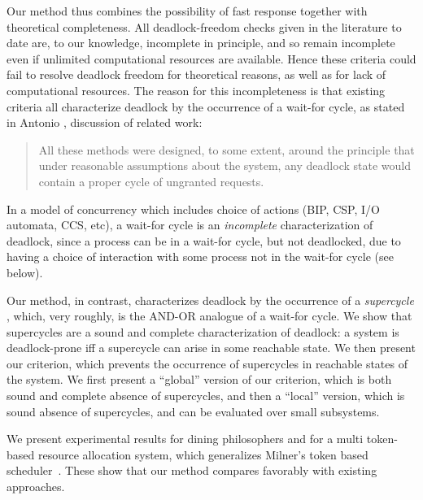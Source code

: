 Our method thus combines the possibility of fast response together with theoretical completeness.
All deadlock-freedom checks given in the literature to date are, to our knowledge, incomplete in
principle, and so remain incomplete even if unlimited computational resources are available.
Hence these criteria could fail to resolve deadlock freedom for theoretical reasons, as well as for 
lack of computational resources.
%
The reason for this incompleteness is that existing criteria all characterize deadlock by the
occurrence of a wait-for cycle, \eg as stated in Antonio \etal \cite{AGR16}, discussion of related
work:
\begin{quote}
All these methods were designed, to some extent, around the principle that under reasonable
assumptions about the system, any deadlock state would contain a proper cycle of ungranted requests.
\end{quote}
In a model of concurrency which includes choice of actions
(\eg BIP, CSP, I/O automata, CCS, etc), a wait-for cycle is an \emph{incomplete} characterization of
deadlock, since a process can be in a wait-for cycle, but not deadlocked, due to having a choice of
interaction with some process not in the wait-for cycle (see  below).

Our method, in contrast, characterizes deadlock by the occurrence of a \emph{supercycle}
\cite{AE98,AC05}, which, very roughly, is the AND-OR analogue of a wait-for cycle. We show that
supercycles are a sound and complete characterization of deadlock: a system is deadlock-prone iff a
supercycle can arise in some reachable state.
%
We then present our criterion, which prevents the occurrence of supercycles in reachable states of
the system. We first present a ``global'' version of our criterion, which is both sound and complete
\wrt absence of supercycles, and then a ``local'' version, which is sound \wrt absence of
supercycles, and can be evaluated over small subsystems.

We present experimental results for dining philosophers and for a multi token-based resource
allocation system, which generalizes Milner's token based scheduler~\cite{milner}.  These show
that our method compares favorably with existing approaches.








